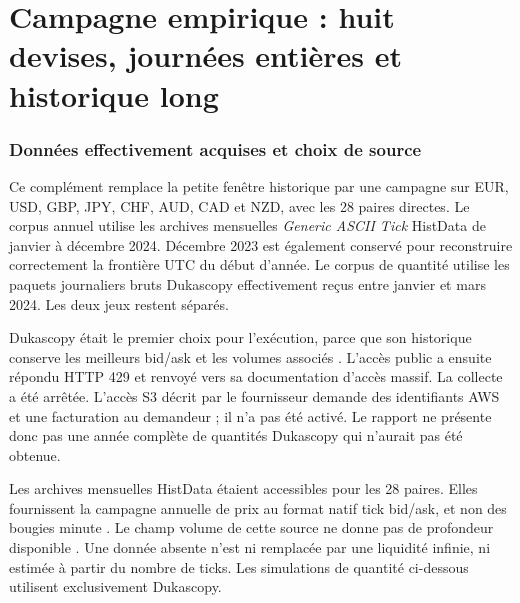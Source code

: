\clearpage
\part{Campagne empirique : huit devises, journées entières et historique long}
\label{part:empirical-eight}


\section{Données effectivement acquises et choix de source}
\label{sec:emp-data}

Ce complément remplace la petite fenêtre historique par une campagne sur EUR, USD, GBP, JPY, CHF, AUD, CAD et NZD, avec les 28 paires directes. Le corpus annuel utilise les archives mensuelles \emph{Generic ASCII Tick} HistData de janvier à décembre 2024. Décembre 2023 est également conservé pour reconstruire correctement la frontière UTC du début d'année. Le corpus de quantité utilise les paquets journaliers bruts Dukascopy effectivement reçus entre janvier et mars 2024. Les deux jeux restent séparés.

\begin{table}[H]\centering\small

\caption{Observations traitées dans les périodes d'étude. Les dates peuvent inclure des séances partielles, notamment le dimanche ; les jours de test et de calibration statistique sont les dates du lundi au vendredi. Les archives originales, y compris le contexte antérieur, sont livrées séparément.}
\end{table}

Dukascopy était le premier choix pour l'exécution, parce que son historique conserve les meilleurs bid/ask et les volumes associés \cite{emp-duka-faq,emp-duka-export}. L'accès public a ensuite répondu HTTP 429 et renvoyé vers sa documentation d'accès massif. La collecte a été arrêtée. L'accès S3 décrit par le fournisseur demande des identifiants AWS et une facturation au demandeur \cite{emp-duka-bulk} ; il n'a pas été activé. Le rapport ne présente donc pas une année complète de quantités Dukascopy qui n'aurait pas été obtenue.

Les archives mensuelles HistData étaient accessibles pour les 28 paires. Elles fournissent la campagne annuelle de prix au format natif tick bid/ask, et non des bougies minute \cite{emp-hist-spec}. Le champ volume de cette source ne donne pas de profondeur disponible \cite{emp-hist-faq}. Une donnée absente n'est ni remplacée par une liquidité infinie, ni estimée à partir du nombre de ticks. Les simulations de quantité ci-dessous utilisent exclusivement Dukascopy.

